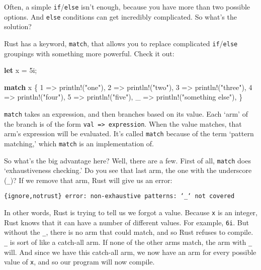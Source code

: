 \documentclass[]{article}
\newenvironment{Shaded}{}{}
\newcommand{\KeywordTok}[1]{\textcolor[rgb]{0.00,0.44,0.13}{\textbf{{#1}}}}
\newcommand{\DecValTok}[1]{\textcolor[rgb]{0.25,0.63,0.44}{{#1}}}
\newcommand{\StringTok}[1]{\textcolor[rgb]{0.25,0.44,0.63}{{#1}}}
\newcommand{\OtherTok}[1]{\textcolor[rgb]{0.00,0.44,0.13}{{#1}}}
\newcommand{\NormalTok}[1]{{#1}}
\begin{document}
Often, a simple \texttt{if}/\texttt{else} isn't enough, because you have
more than two possible options. And \texttt{else} conditions can get
incredibly complicated. So what's the solution?

Rust has a keyword, \texttt{match}, that allows you to replace
complicated \texttt{if}/\texttt{else} groupings with something more
powerful. Check it out:

\begin{Shaded}
\begin{Highlighting}[]
\KeywordTok{let} \NormalTok{x = }\DecValTok{5i}\NormalTok{;}

\KeywordTok{match} \NormalTok{x \{}
    \DecValTok{1} \NormalTok{=> }\OtherTok{println!}\NormalTok{(}\StringTok{"one"}\NormalTok{),}
    \DecValTok{2} \NormalTok{=> }\OtherTok{println!}\NormalTok{(}\StringTok{"two"}\NormalTok{),}
    \DecValTok{3} \NormalTok{=> }\OtherTok{println!}\NormalTok{(}\StringTok{"three"}\NormalTok{),}
    \DecValTok{4} \NormalTok{=> }\OtherTok{println!}\NormalTok{(}\StringTok{"four"}\NormalTok{),}
    \DecValTok{5} \NormalTok{=> }\OtherTok{println!}\NormalTok{(}\StringTok{"five"}\NormalTok{),}
    \NormalTok{_ => }\OtherTok{println!}\NormalTok{(}\StringTok{"something else"}\NormalTok{),}
\NormalTok{\}}
\end{Highlighting}
\end{Shaded}

\texttt{match} takes an expression, and then branches based on its
value. Each `arm' of the branch is of the form
\texttt{val =\textgreater{} expression}. When the value matches, that
arm's expression will be evaluated. It's called \texttt{match} because
of the term `pattern matching,' which \texttt{match} is an
implementation of.

So what's the big advantage here? Well, there are a few. First of all,
\texttt{match} does `exhaustiveness checking.' Do you see that last arm,
the one with the underscore (\texttt{\_})? If we remove that arm, Rust
will give us an error:

\texttt{\{ignore,notrust\} error: non-exhaustive patterns: `\_` not covered}

In other words, Rust is trying to tell us we forgot a value. Because
\texttt{x} is an integer, Rust knows that it can have a number of
different values. For example, \texttt{6i}. But without the \texttt{\_},
there is no arm that could match, and so Rust refuses to compile.
\texttt{\_} is sort of like a catch-all arm. If none of the other arms
match, the arm with \texttt{\_} will. And since we have this catch-all
arm, we now have an arm for every possible value of \texttt{x}, and so
our program will now compile.
\end{document}
